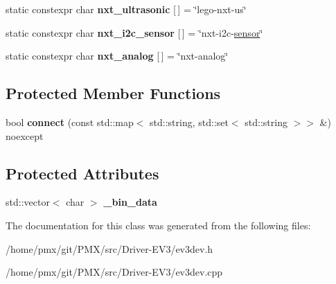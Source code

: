 \begin{DoxyCompactItemize}
\item 
\mbox{\label{classev3dev_1_1sensor_a20ab6dd9cdec624208fec9cca4bbea7a}} 
static constexpr char {\bfseries nxt\+\_\+ultrasonic} \mbox{[}$\,$\mbox{]} = \char`\"{}lego-\/nxt-\/us\char`\"{}
\item 
\mbox{\label{classev3dev_1_1sensor_a51b2d7a0c30a22c4a694b798973ef586}} 
static constexpr char {\bfseries nxt\+\_\+i2c\+\_\+sensor} \mbox{[}$\,$\mbox{]} = \char`\"{}nxt-\/i2c-\/\hyperlink{classev3dev_1_1sensor}{sensor}\char`\"{}
\item 
\mbox{\label{classev3dev_1_1sensor_ac5de4d03b3f387b669c87bea802cb1ad}} 
static constexpr char {\bfseries nxt\+\_\+analog} \mbox{[}$\,$\mbox{]} = \char`\"{}nxt-\/analog\char`\"{}
\end{DoxyCompactItemize}
\subsection*{Protected Member Functions}
\begin{DoxyCompactItemize}
\item 
\mbox{\label{classev3dev_1_1sensor_a7008ffd16b0f4032dc8970ced485eacf}} 
bool {\bfseries connect} (const std\+::map$<$ std\+::string, std\+::set$<$ std\+::string $>$$>$ \&) noexcept
\end{DoxyCompactItemize}
\subsection*{Protected Attributes}
\begin{DoxyCompactItemize}
\item 
\mbox{\label{classev3dev_1_1sensor_a71dcc49e749a906f5e0c2a5eafe0000e}} 
std\+::vector$<$ char $>$ {\bfseries \+\_\+bin\+\_\+data}
\end{DoxyCompactItemize}


The documentation for this class was generated from the following files\+:\begin{DoxyCompactItemize}
\item 
/home/pmx/git/\+P\+M\+X/src/\+Driver-\/\+E\+V3/ev3dev.\+h\item 
/home/pmx/git/\+P\+M\+X/src/\+Driver-\/\+E\+V3/ev3dev.\+cpp\end{DoxyCompactItemize}
